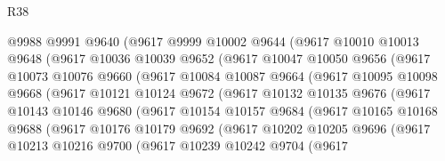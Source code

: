 \begin{lexlean}{R38}
\begin{coremodule}
                @9988
                @9991
                @9640
                (@9617
                  @9999
                  @10002
                  @9644
                  (@9617
                    @10010
                    @10013
                    @9648
                    (@9617
                      @10036
                      @10039
                      @9652
                      (@9617
                        @10047
                        @10050
                        @9656
                        (@9617
                          @10073
                          @10076
                          @9660
                          (@9617
                            @10084
                            @10087
                            @9664
                            (@9617
                              @10095
                              @10098
                              @9668
                              (@9617
                                @10121
                                @10124
                                @9672
                                (@9617
                                  @10132
                                  @10135
                                  @9676
                                  (@9617
                                    @10143
                                    @10146
                                    @9680
                                    (@9617
                                      @10154
                                      @10157
                                      @9684
                                      (@9617
                                        @10165
                                        @10168
                                        @9688
                                        (@9617
                                          @10176
                                          @10179
                                          @9692
                                          (@9617
                                            @10202
                                            @10205
                                            @9696
                                            (@9617
                                              @10213
                                              @10216
                                              @9700
                                              (@9617
                                                @10239
                                                @10242
                                                @9704
                                                (@9617

\end{coremodule}
\end{lexlean}
